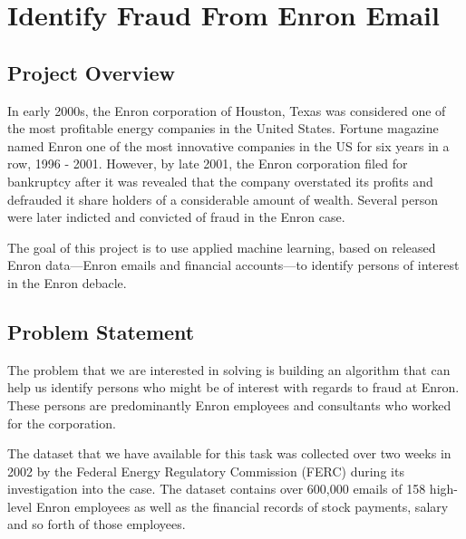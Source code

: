 \documentclass[twoside,openright,titlepage,numbers=noenddot,headinclude,%
               footinclude=true,cleardoublepage=empty,abstractoff,BCOR=5mm,%
               paper=a4,fontsize=11pt,ngerman,american]{scrreprt}
\numberwithin{theorem}{chapter}
\numberwithin{definition}{chapter}
\numberwithin{algorithm}{chapter}
\numberwithin{figure}{chapter}
\numberwithin{table}{chapter}
\numberwithin{equation}{chapter}
\begin{document}
\frenchspacing
\raggedbottom
{}
\pagestyle{plain}






\cleardoublepage


\chapter*{Identify Fraud From Enron Email}



\section*{Project Overview}

In early 2000s, the Enron corporation of Houston, Texas was considered one of the most profitable energy companies in the United States. Fortune magazine named Enron one of the most innovative companies in the US for six years in a row, 1996 - 2001. However, by late 2001, the Enron corporation filed for bankruptcy after it was revealed that the company overstated its profits and defrauded it share holders of a considerable amount of wealth. Several person were later indicted and convicted of fraud in the Enron case. 

The goal of this project is to use applied machine learning, based on released Enron data---Enron emails and financial accounts---to identify persons of interest in the Enron debacle.


\section*{Problem Statement}

The problem that we are interested in solving is building an algorithm that can help us identify persons who might be of interest with regards to fraud at Enron. These persons are predominantly Enron employees and consultants who worked for the corporation. 

The dataset that we have available for this task was collected over two weeks in 2002 by the Federal Energy Regulatory Commission (FERC) during its investigation into the case. The dataset contains over 600,000 emails of 158 high-level Enron employees as well as the financial records of stock payments, salary and so forth of those employees.
\end{document}
